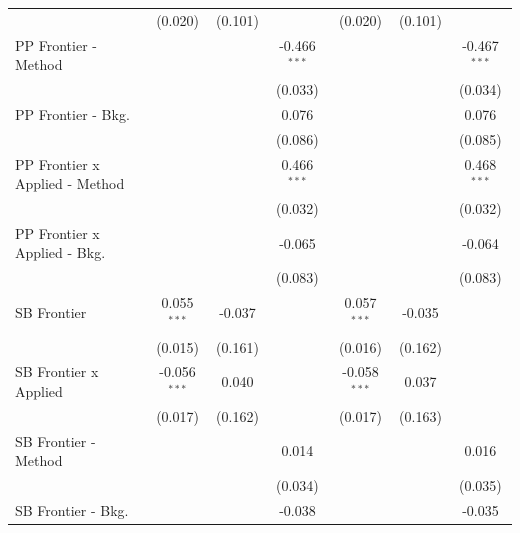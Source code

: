 \begin{tabular}{lcccccc}
                                  & (0.020)        & (0.101)      &                & (0.020)        & (0.101)      &   \\   
   PP Frontier - Method           &                &              & -0.466$^{***}$ &                &              & -0.467$^{***}$\\   
                                  &                &              & (0.033)        &                &              & (0.034)\\   
   PP Frontier - Bkg.             &                &              & 0.076          &                &              & 0.076\\   
                                  &                &              & (0.086)        &                &              & (0.085)\\   
   PP Frontier x Applied - Method &                &              & 0.466$^{***}$  &                &              & 0.468$^{***}$\\   
                                  &                &              & (0.032)        &                &              & (0.032)\\   
   PP Frontier x Applied - Bkg.   &                &              & -0.065         &                &              & -0.064\\   
                                  &                &              & (0.083)        &                &              & (0.083)\\   
   SB Frontier                    & 0.055$^{***}$  & -0.037       &                & 0.057$^{***}$  & -0.035       &   \\   
                                  & (0.015)        & (0.161)      &                & (0.016)        & (0.162)      &   \\   
   SB Frontier x Applied          & -0.056$^{***}$ & 0.040        &                & -0.058$^{***}$ & 0.037        &   \\   
                                  & (0.017)        & (0.162)      &                & (0.017)        & (0.163)      &   \\   
   SB Frontier - Method           &                &              & 0.014          &                &              & 0.016\\   
                                  &                &              & (0.034)        &                &              & (0.035)\\   
   SB Frontier - Bkg.             &                &              & -0.038         &                &              & -0.035\\   

\end{tabular}
